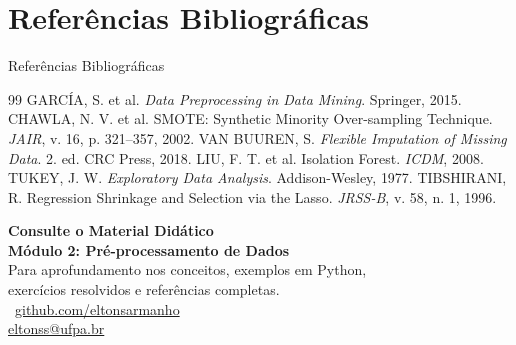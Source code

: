 \documentclass[aspectratio=169]{beamer}
\begin{document}
\section{Referências Bibliográficas}
\begin{frame}{Referências Bibliográficas}
    \begin{thebibliography}{99}
        \footnotesize
        GARCÍA, S. et al. \textit{Data Preprocessing in Data Mining}. Springer, 2015.
        CHAWLA, N. V. et al. SMOTE: Synthetic Minority Over-sampling Technique. \textit{JAIR}, v. 16, p. 321--357, 2002.
        VAN BUUREN, S. \textit{Flexible Imputation of Missing Data}. 2. ed. CRC Press, 2018.
        LIU, F. T. et al. Isolation Forest. \textit{ICDM}, 2008.
        TUKEY, J. W. \textit{Exploratory Data Analysis}. Addison-Wesley, 1977.
        TIBSHIRANI, R. Regression Shrinkage and Selection via the Lasso. \textit{JRSS-B}, v. 58, n. 1, 1996.
    \end{thebibliography}
\end{frame}

\begin{frame}[c]
    \begin{center}
        \Large \textbf{Consulte o Material Didático}\\[1em]
        \normalsize \textcolor{mineblue}{\textbf{Módulo 2: Pré-processamento de Dados}}\\[0.5em]
        \small Para aprofundamento nos conceitos, exemplos em Python,\\
        exercícios resolvidos e referências completas.\\[1.5em]
        \large \faGithub \ \href{https://github.com/eltonsarmanho}{github.com/eltonsarmanho}\\[0.5em]
        \href{mailto:eltonss@ufpa.br}{eltonss@ufpa.br}
    \end{center}
\end{frame}
\end{document}
